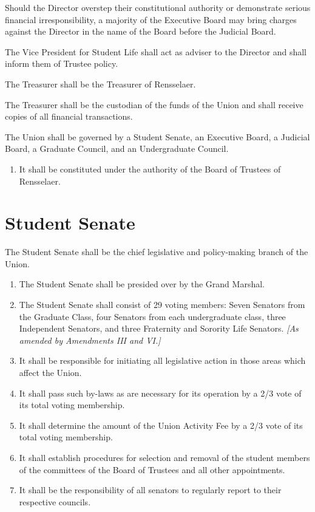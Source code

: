 \documentclass{uniondoc}
\begin{document}
Should the Director overstep their constitutional authority or demonstrate serious financial irresponsibility, a majority of the Executive Board may bring charges against the Director in the name of the Board before the Judicial Board.

The Vice President for Student Life shall act as adviser to the Director and shall inform them of Trustee policy.


The Treasurer shall be the Treasurer of Rensselaer.

The Treasurer shall be the custodian of the funds of the Union and shall receive copies of all financial transactions.


The Union shall be governed by a Student Senate, an Executive Board, a Judicial Board, a Graduate Council, and an Undergraduate Council.

\begin{enumerate}
	\item It shall be constituted under the authority of the Board of Trustees of Rensselaer.
\end{enumerate}

\section{Student Senate}

The Student Senate shall be the chief legislative and policy-making branch of the Union.

\begin{enumerate}
	\item The Student Senate shall be presided over by the Grand Marshal.
	\item The Student Senate shall consist of 29 voting members: Seven Senators from the Graduate Class, four Senators from each undergraduate class, three Independent Senators, and three Fraternity and Sorority Life Senators. \textit{[As amended by Amendments III and VI.]}
	\item It shall be responsible for initiating all legislative action in those areas which affect the Union.
	\item It shall pass such by-laws as are necessary for its operation by a 2/3 vote of its total voting membership.
	\item It shall determine the amount of the Union Activity Fee by a 2/3 vote of its total voting membership.
	\item It shall establish procedures for selection and removal of the student members of the committees of the Board of Trustees and all other appointments.
	\item It shall be the responsibility of all senators to regularly report to their respective councils.
\end{enumerate}
\end{document}
